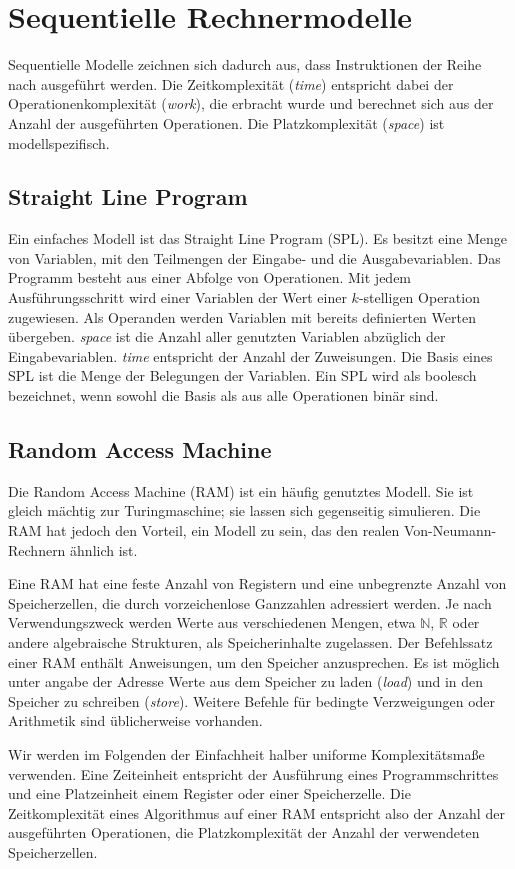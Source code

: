 \section{Sequentielle Rechnermodelle}
Sequentielle Modelle zeichnen sich dadurch aus, dass Instruktionen der Reihe nach ausgeführt werden.
Die Zeitkomplexität (\emph{time}) entspricht dabei der Operationenkomplexität (\emph{work}), die erbracht wurde und berechnet sich aus der Anzahl der ausgeführten Operationen.
Die Platzkomplexität (\emph{space}) ist modellspezifisch.


\subsection{Straight Line Program}
Ein einfaches Modell ist das Straight Line Program (SPL).
Es besitzt eine Menge von Variablen, mit den Teilmengen der Eingabe- und die Ausgabevariablen.
Das Programm besteht aus einer Abfolge von Operationen.
Mit jedem Ausführungsschritt wird einer Variablen der Wert einer $k$-stelligen Operation zugewiesen.
Als Operanden werden Variablen mit bereits definierten Werten übergeben.
\emph{space} ist die Anzahl aller genutzten Variablen abzüglich der Eingabevariablen.
\emph{time} entspricht der Anzahl der Zuweisungen.
Die Basis eines SPL ist die Menge der Belegungen der Variablen.
Ein SPL wird als boolesch bezeichnet, wenn sowohl die Basis als aus alle Operationen binär sind.
\cite[S. 9]{reif}


\subsection{Random Access Machine}
Die Random Access Machine (RAM) ist ein häufig genutztes Modell.
Sie ist gleich mächtig zur Turingmaschine; sie lassen sich gegenseitig simulieren.
Die RAM hat jedoch den Vorteil, ein Modell zu sein, das den realen Von-Neumann-Rechnern ähnlich ist.

Eine RAM hat eine feste Anzahl von Registern und eine unbegrenzte Anzahl von Speicherzellen, die durch vorzeichenlose Ganzzahlen adressiert werden.
Je nach Verwendungszweck werden Werte aus verschiedenen Mengen, etwa $\mathbb{N}$, $\mathbb{R}$ oder andere algebraische Strukturen, als Speicherinhalte zugelassen.
Der Befehlssatz einer RAM enthält Anweisungen, um den Speicher anzusprechen.
Es ist möglich unter angabe der Adresse Werte aus dem Speicher zu laden (\emph{load}) und in den Speicher zu schreiben (\emph{store}).
Weitere Befehle für bedingte Verzweigungen oder Arithmetik sind üblicherweise vorhanden.

Wir werden im Folgenden der Einfachheit halber uniforme Komplexitätsmaße verwenden.
Eine Zeiteinheit entspricht der Ausführung eines Programmschrittes
und eine Platzeinheit einem Register oder einer Speicherzelle.
Die Zeitkomplexität eines Algorithmus auf einer RAM entspricht also der Anzahl der ausgeführten Operationen, die Platzkomplexität der Anzahl der verwendeten Speicherzellen.
\cite[S. 9ff.]{reif}
\cite[Kapitel 10.1]{fgi2}

